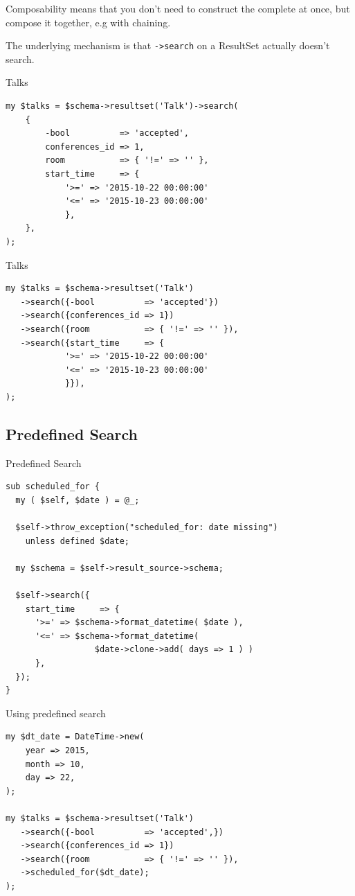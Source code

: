 Composability means that you don't need to construct the
complete at once, but compose it together, e.g with
chaining.

The underlying mechanism is that \verb|->search| on a
ResultSet actually doesn't search.

\begin{frame}[fragile]{Talks}

\begin{lstlisting}
my $talks = $schema->resultset('Talk')->search(
    {
        -bool          => 'accepted',
        conferences_id => 1,
        room           => { '!=' => '' },
        start_time     => {
            '>=' => '2015-10-22 00:00:00'
            '<=' => '2015-10-23 00:00:00'
            },
    },
);
\end{lstlisting}
\end{frame}

\begin{frame}[fragile]{Talks}

\begin{lstlisting}
my $talks = $schema->resultset('Talk')
   ->search({-bool          => 'accepted'})
   ->search({conferences_id => 1})
   ->search({room           => { '!=' => '' }),
   ->search({start_time     => {
            '>=' => '2015-10-22 00:00:00'
            '<=' => '2015-10-23 00:00:00'
            }}),
);
\end{lstlisting}
\end{frame}

\subsection{Predefined Search}
\begin{frame}[fragile]{Predefined Search}
\begin{lstlisting}
sub scheduled_for {
  my ( $self, $date ) = @_;

  $self->throw_exception("scheduled_for: date missing")
    unless defined $date;
    
  my $schema = $self->result_source->schema;

  $self->search({
    start_time     => {
      '>=' => $schema->format_datetime( $date ),
      '<=' => $schema->format_datetime( 
                  $date->clone->add( days => 1 ) )
      },
  });
}
\end{lstlisting}
\end{frame}


\begin{frame}[fragile]{Using predefined search}

\begin{lstlisting}
my $dt_date = DateTime->new(
    year => 2015,
    month => 10,
    day => 22,
);

my $talks = $schema->resultset('Talk')
   ->search({-bool          => 'accepted',})
   ->search({conferences_id => 1})
   ->search({room           => { '!=' => '' }),
   ->scheduled_for($dt_date);
);
\end{lstlisting}
\end{frame}

